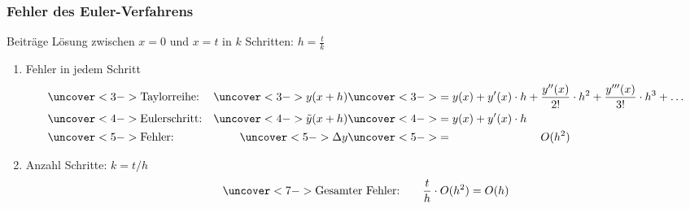 %
%
%
\begin{frame}
\frametitle{Fehler des Euler-Verfahrens}
\begin{block}{Beiträge}
Lösung zwischen $x=0$ und $x=t$ in $k$ Schritten: $h=\frac{t}{k}$
\begin{enumerate}
\item<2->
Fehler in jedem Schritt 
\vspace{-10pt}
\begin{align*}
&\uncover<3->{\text{Taylorreihe:}}&
\uncover<3->{y(x+h)}
&\uncover<3->{= 
y(x) + y'(x)\cdot h + \frac{y''(x)}{2!}\cdot h^2 +\frac{y'''(x)}{3!}\cdot h^3+\dots}
\\
&\uncover<4->{\text{Eulerschritt:}}&
\uncover<4->{\tilde{y}(x+h)}
&\uncover<4->{=
y(x) + y'(x)\cdot h}
\\
&\uncover<5->{\text{Fehler:}}&
\uncover<5->{\Delta y}
&\uncover<5->{=
\phantom{ y(x) + y'(x)\cdot h+\mathstrut}
O(h^2)}
\end{align*}
\vspace{-15pt}
\item<6->
Anzahl Schritte: $k=t/h$
\vspace{-5pt}
\[
\uncover<7->{
\text{Gesamter Fehler:}\qquad \frac{t}{h}\cdot O(h^2) = O(h)
}
\]
\end{enumerate}
\end{block}
\vspace{-25pt}

\end{frame}
